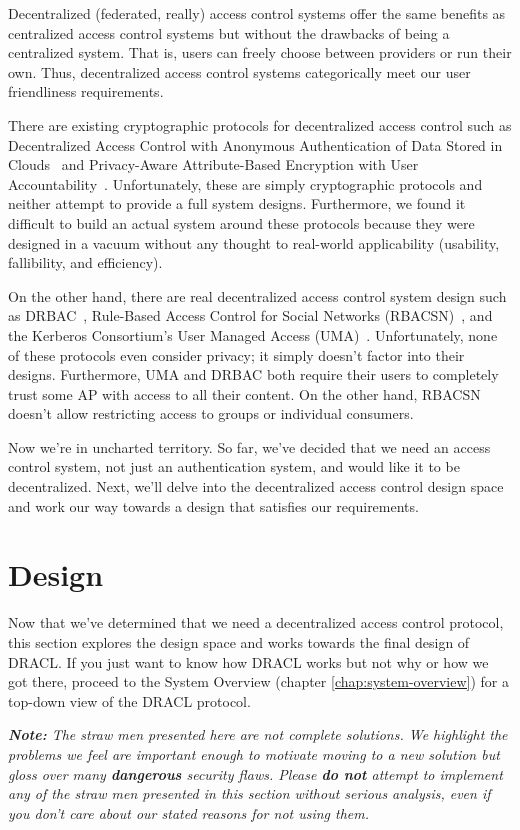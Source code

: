 \documentclass[pdftex,12pt,a4papaer,twoside,notitlepage]{report}
\newcommand{\note}[1]{\vspace{1em} \begin{spacing}{1}\textit{\textbf{Note:} #1}\end{spacing}\vspace{1em}}
\begin{document}
Decentralized (federated, really) access control systems offer the same benefits
as centralized access control systems but without the drawbacks of being a
centralized system. That is, users can freely choose between providers or run
their own. Thus, decentralized access control systems categorically meet our
user friendliness requirements.

There are existing cryptographic protocols for decentralized access control such
as Decentralized Access Control with Anonymous Authentication of Data Stored in
Clouds~\cite{attrib} and Privacy-Aware Attribute-Based Encryption with User
Accountability~\cite{privattrib}. Unfortunately, these are simply cryptographic
protocols and neither attempt to provide a full system designs. Furthermore, we
found it difficult to build an actual system around these protocols because they
were designed in a vacuum without any thought to real-world applicability
(usability, fallibility, and efficiency).

On the other hand, there are real decentralized access control system design
such as DRBAC~\cite{drbac}, Rule-Based Access Control for Social Networks
(RBACSN)~\cite{socnet}, and the Kerberos Consortium's User Managed Access
(UMA)~\cite{uma}. Unfortunately, none of these protocols even consider privacy;
it simply doesn't factor into their designs. Furthermore, UMA and DRBAC both
require their users to completely trust some AP with access to all their
content. On the other hand, RBACSN doesn't allow restricting access to groups or
individual consumers.

Now we're in uncharted territory. So far, we've decided that we need an access
control system, not just an authentication system, and would like it to be
decentralized. Next, we'll delve into the decentralized access control design
space and work our way towards a design that satisfies our requirements.

\section{Design}
\label{sec:design}

Now that we've determined that we need a decentralized access control protocol,
this section explores the design space and works towards the final design of
DRACL. If you just want to know how DRACL works but not why or how we got there,
proceed to the System Overview (chapter \ref{chap:system-overview}) for a
top-down view of the DRACL protocol.

\note{The straw men presented here are not complete solutions. We highlight the
  problems we feel are important enough to motivate moving to a new solution but
  gloss over many \textbf{dangerous} security flaws. Please \textbf{do not}
  attempt to implement any of the straw men presented in this section without
  serious analysis, even if you don't care about our stated reasons for not using
  them.}
\end{document}
